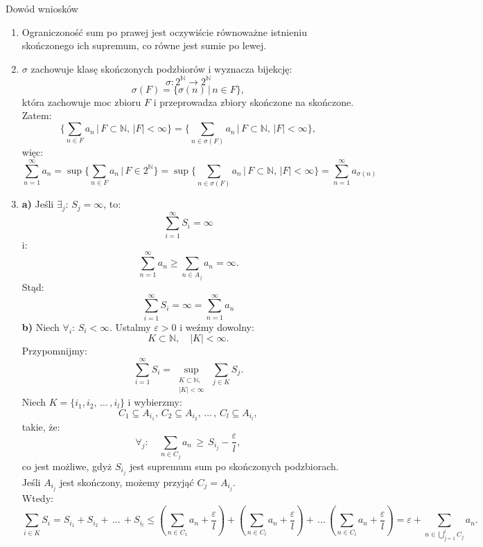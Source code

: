\documentclass{article}
\numberwithin{defi}{section}
\numberwithin{defi}{section}
\newcommand{\N}{\mathbb{N}}
\newcommand{\oo}{\infty}
\begin{document}
\begin{dow}{Dowód wniosków}
    \begin{enumerate}
        \item Ograniczoność sum po prawej jest oczywiście równoważne istnieniu skończonego ich supremum, co równe jest sumie po lewej.
        \item $\sigma$ zachowuje klasę skończonych podzbiorów i wyznacza bijekcję:
              \[\sigma: 2^{\N} \rightarrow 2^{\N}\]
              \[\sigma(F) = \{ \sigma(n)\,|\, n \in F \},\]
              która zachowuje moc zbioru $F$ i przeprowadza zbiory skończone na skończone. Zatem:
              \[\biggl\{ \sum_{n \in F} a_n \, \bigg| \, F \subset \N, \, |F| < \oo\biggr\} = \biggl\{ \sum_{n \in \sigma(F)} a_{n} \, \bigg| \, F \subset \N, \, |F| < \oo\biggr\}, \]
              więc:
              \[ \sum_{n=1}^{\oo} a_n = \sup{\biggl\{ \sum_{n \in F} a_n \, \bigg| \, F \in 2^{\N}\biggr\}}  = \sup{\biggl\{ \sum_{n \in \sigma(F)} a_{n} \, \bigg| \, F \subset \N, \, |F| < \oo\biggr\}} = \sum_{n=1}^{\oo} a_{\sigma(n)}\]
        \item
              \textbf{a)} Jeśli $\exists_j: \, S_j = \oo$, to:
              \[\sum_{i=1}^{\oo} S_i = \oo\]
              i:
              \[\sum_{n=1}^{\oo} a_n \geqslant \sum_{n \in A_j} a_n = \oo.\]
              Stąd:
              \[\sum_{i=1}^{\oo} S_i = \oo = \sum_{n=1}^{\oo} a_n\]
              \textbf{b)} Niech $\forall_{i}: \, S_i < \oo$. Ustalmy $\varepsilon > 0$ i weźmy dowolny:
              \[K \subset \N, \quad |K| < \oo.\]
              Przypomnijmy:
              \[\sum_{i=1}^{\oo}S_i = \sup_{\substack{K \subset \N, \\ |K| < \oo}} \, \sum_{j \in K} S_j.\]
              Niech $K = \{ i_1, i_2,\, ...\,, i_l \}$ i wybierzmy:
              \[C_1 \subseteq A_{i_1}, \, C_2 \subseteq A_{i_2}, \, ...\, , \, C_l \subseteq A_{i_l}, \]
              takie, że:
              \[\forall_j: \quad \sum_{n \in C_j} a_n \,  \geqslant \, S_{i_j} - \frac{\varepsilon}{l},\]
              co jest możliwe, gdyż $S_{i_j}$ jest supremum sum po skończonych podzbiorach. Jeśli $A_{i_j}$ jest skończony, możemy przyjąć $C_j = A_{i_j}$. \\
              Wtedy:
              \[\sum_{i \in K} S_i = S_{i_1} + S_{i_2} + \, ... \, + S_{i_l} \leqslant \left( \sum_{n\in C_1} a_n + \frac{\varepsilon}{l} \right) + \left( \sum_{n\in C_l} a_n + \frac{\varepsilon}{l} \right) + \, ... \, \left( \sum_{n\in C_l} a_n + \frac{\varepsilon}{l} \right) = \varepsilon + \sum_{n \in \bigcup_{j=1}^l C_j} a_n.\]

\end{enumerate}
\end{dow}
\end{document}
